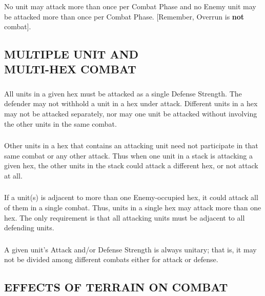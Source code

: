 \subsubsection{} No unit may attack more than once per Combat Phase and no Enemy unit may be attacked more than once per Combat Phase. [Remember, Overrun is \textbf{not} combat].

\subsection{MULTIPLE UNIT AND\\MULTI-HEX COMBAT}

\subsubsection{} All units in a given hex must be attacked as a single Defense Strength. The defender may not withhold a unit in a hex under attack. Different units in a hex may not be attacked separately, nor may one unit be attacked without involving the other units in the same combat.

\subsubsection{} Other units in a hex that contains an attacking unit need not participate in that same combat or any other attack. Thus when one unit in a stack is attacking a given hex, the other units in the stack could attack a different hex, or not attack at all.

\subsubsection{} If a unit(s) is adjacent to more than one Enemy-occupied hex, it could attack all of them in a single combat. Thus, units in a single hex may attack more than one hex. The only requirement is that all attacking units must be adjacent to all defending units.

\subsubsection{} A given unit's Attack and/or Defense Strength is always unitary; that is, it may not be divided among different combats either for attack or defense.

\begin{flushleft}
  \subsection{EFFECTS OF TERRAIN ON COMBAT}
\end{flushleft}

